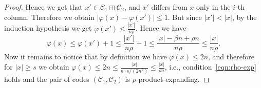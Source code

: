 \documentclass[11pt]{article}
\let\le\leqslant
\let\ge\geqslant
\let\phi\varphi
\theoremstyle{plain}
\theoremstyle{definition}
\theoremstyle{remark}
\newcommand{\wt}{\mathbf{wt}}
\newcommand{\cC}{\mathcal{C}}
\newcommand{\F}{\mathbb{F}}
\DeclareMathOperator*{\argmin}{arg\,min}
\begin{document}
\begin{proof}
    Hence we get that $x'\in \cC_1\boxplus \cC_2$, and $x'$ differs from $x$ only in the $i$-th column. Therefore we obtain  $|\phi(x)-\phi(x')|\le 1$.
    But since $|x'|<|x|$, by the induction hypothesis we get $\phi(x')\le\frac{|x'|}{n\rho}$. Hence we have 
    $$\phi(x)\le\phi(x')+1\le \frac{|x'|}{n\rho}+1\le \frac{|x|-\beta n+\rho n}{n\rho}\le \frac{|x|}{n\rho}.$$
    Now it remains to notice that by definition we have $\phi(x)\le 2n$, and therefore for $|x|\ge s$ we obtain  $\phi(x)\le 2n\le \frac{|x|}{n\cdot s/(2n^2)}\le\frac{|x|}{\rho n}$, i.e., condition~\eqref{eqn:rho-exp} holds and the pair of codes  $(\cC_1,\cC_2)$ is $\rho$-product-expanding.

\end{proof}
\end{document}
